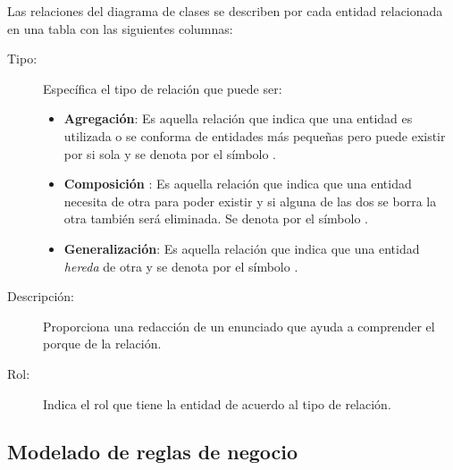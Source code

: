 Las relaciones del diagrama de clases se describen por cada entidad relacionada en una tabla con las siguientes columnas:

\begin{description}
	\item[Tipo:] Específica el tipo de relación que puede ser:
		\begin{itemize}
			\item \textbf{Agregación}: Es aquella relación que indica que una entidad es utilizada o se conforma de entidades más pequeñas pero puede existir por si sola y se denota por el símbolo \brRelAgregation.
			\item \textbf{Composición} : Es aquella relación que indica que una entidad necesita de otra para poder existir y si alguna de las dos se borra la otra también será eliminada. Se denota por el símbolo \brRelComposition.
			\item \textbf{Generalización}: Es aquella relación que indica que una entidad \textit{hereda} de otra y se denota por el símbolo \brRelGeneralization.
		\end{itemize}
	\item[Descripción:] Proporciona una redacción de un enunciado que ayuda a comprender el porque de la relación.
	\item[Rol:] Indica el rol que tiene la entidad de acuerdo al tipo de relación.
\end{description}




\subsection{Modelado de reglas de negocio}

